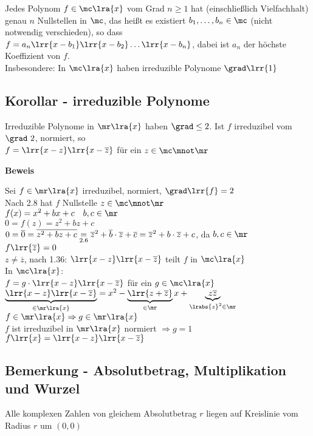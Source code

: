 	Jedes Polynom $f\in\mc\lra{x}$ vom Grad $n\geq 1$ hat (einschließlich Vielfachhalt) genau $n$ Nullstellen in $\mc$, das heißt es existiert $b_1,\dots,b_n\in\mc$ (nicht notwendig verschieden), so dass $f=a_n\lrr{x-b_1}\lrr{x-b_2}\dots\lrr{x-b_n}$, dabei ist $a_n$ der höchste Koeffizient von $f$. \\
	Insbesondere: In $\mc\lra{x}$ haben irreduzible Polynome $\grad\lrr{1}$

\subsection{Korollar - irreduzible Polynome}
	Irreduzible Polynome in $\mr\lra{x}$ haben $\grad\leq 2$. Ist $f$ irreduzibel vom $\grad\ 2$, normiert, so \\
	$f=\lrr{x-z}\lrr{x-\overline{z}}$ für ein $z\in\mc\mnot\mr$

	\textbf{Beweis}

	Sei $f\in\mr\lra{x}$ irreduzibel, normiert, $\grad\lrr{f}=2$\\
	Nach 2.8 hat $f$ Nullstelle $z\in\mc\mnot\mr$\\
	$f(x)=x^2+bx+c\quad b,c\in\mr$\\
	$0=f(z)=z^2+bz+c$\\
	$0=\overline{0}=\overline{z^2+bz+c} \underset{\mbox{\scriptsize 2.6}}{=}\overline{z}^2+\overline{b}\cdot\overline{z}+\overline{c}=\overline{z}^2+b\cdot\overline{z}+c$, da $b,c\in\mr$\\
	$f\lrr{\overline{z}}=0$\\
	$z\neq\overline{z}$, nach 1.36: $\lrr{x-z}\lrr{x-\overline{z}}$ teilt $f$ in $\mc\lra{x}$\\
	In $\mc\lra{x}$:\\
	$f=g\cdot\lrr{x-z}\lrr{x-\overline{z}}$ für ein $g\in\mc\lra{x}$\\
	$\underbrace{\lrr{x-z}\lrr{x-\overline{z}}}_{\in\mr\lra{x}}=x^2-\underbrace{\lrr{z+\overline{z}}}_{\in\mr}x+\underbrace{z\overline{z}}_{\scriptstyle \lrabs{z}^2\in\mr}$\\
	$f\in\mr\lra{x}\Rightarrow g\in\mr\lra{x}$\\
	$f$ ist irreduzibel in $\mr\lra{x}$ normiert $\Rightarrow g=1$\\
	$f\lrr{x}=\lrr{x-z}\lrr{x-\overline{z}}$

\subsection{Bemerkung - Absolutbetrag, Multiplikation und Wurzel}
		\item Alle komplexen Zahlen von gleichem Absolutbetrag $r$ liegen auf Kreislinie vom Radius $r$ um $(0,0)$

